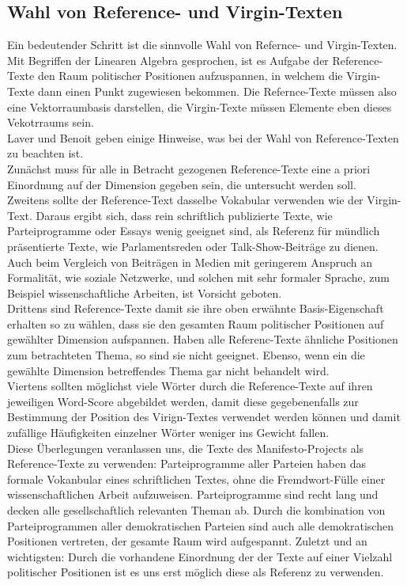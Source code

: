   \subsection{Wahl von Reference- und Virgin-Texten}
  Ein bedeutender Schritt ist die sinnvolle Wahl von Refernce- und Virgin-Texten. Mit Begriffen der Linearen Algebra gesprochen, ist es Aufgabe der Reference-Texte den Raum politischer Positionen aufzuspannen, in welchem die Virgin-Texte dann einen Punkt zugewiesen bekommen. Die Refernce-Texte müssen also eine Vektorraumbasis darstellen, die Virgin-Texte müssen Elemente eben dieses Vekotrraums sein. \\
  Laver und Benoit \cite{LuB} geben einige Hinweise, was bei der Wahl von Reference-Texten zu beachten ist. \\
  Zunächst muss für alle in Betracht gezogenen Reference-Texte eine a priori Einordnung auf der Dimension gegeben sein, die untersucht werden soll. \\
  Zweitens sollte der Reference-Text dasselbe Vokabular verwenden wie der Virgin-Text. Daraus ergibt sich, dass rein schriftlich publizierte Texte, wie Parteiprogramme oder Essays wenig geeignet sind, als Referenz für mündlich präsentierte Texte, wie Parlamentsreden oder Talk-Show-Beiträge zu dienen. Auch beim Vergleich von Beiträgen in Medien mit geringerem Anspruch an Formalität, wie soziale Netzwerke, und solchen mit sehr formaler Sprache, zum Beispiel wissenschaftliche Arbeiten, ist Vorsicht geboten. \\
  Drittens sind Reference-Texte damit sie ihre oben erwähnte Basis-Eigenschaft erhalten so zu wählen, dass sie den gesamten Raum politischer Positionen auf gewählter Dimension aufspannen. Haben alle Referenc-Texte ähnliche Positionen zum betrachteten Thema, so sind sie nicht geeignet. Ebenso, wenn ein die gewählte Dimension betreffendes Thema gar nicht behandelt wird.  \\
  Viertens sollten möglichst viele Wörter durch die Reference-Texte auf ihren jeweiligen Word-Score abgebildet werden, damit diese gegebenenfalls zur Bestimmung der Position des Virign-Textes verwendet werden können und damit zufällige Häufigkeiten einzelner Wörter weniger ins Gewicht fallen.  \\
  Diese Überlegungen veranlassen uns, die Texte des Manifesto-Projects als Reference-Texte zu verwenden: Parteiprogramme aller Parteien haben das formale Vokanbular eines schriftlichen Textes, ohne die Fremdwort-Fülle einer wissenschaftlichen Arbeit aufzuweisen. Parteiprogramme sind recht lang und decken alle gesellschaftlich relevanten Theman ab. Durch die kombination von Parteiprogrammen aller demokratischen Parteien sind auch alle demokratischen Positionen vertreten, der gesamte Raum wird aufgespannt. Zuletzt und an wichtigsten: Durch die vorhandene Einordnung der der Texte auf einer Vielzahl politischer Positionen ist es uns erst möglich diese als Referenz zu verwenden. 
  
